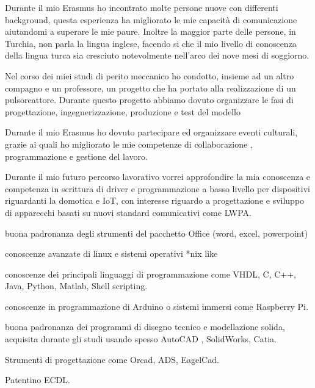 \documentclass[italian,a4paper]{europasscv}
\begin{document}
\begin{europasscv}
	 {
		\begin{ecvitemize}
			\item Durante il mio Erasmus ho incontrato molte persone nuove con
				differenti background, questa esperienza ha migliorato le mie
				capacità di comunicazione aiutandomi a superare le mie paure.
				Inoltre la maggior parte delle persone, in Turchia, non parla la
				lingua inglese, facendo si che il mio livello di conoscenza della
				lingua turca sia cresciuto notevolmente nell'arco dei nove mesi
				di soggiorno.
		\end{ecvitemize}
	}

	 {
	\begin{ecvitemize}
		\item Nel corso dei miei studi di perito meccanico ho condotto, insieme
			ad un altro compagno e un professore, un progetto che ha portato alla
			realizzazione di un pulsoreattore. Durante questo progetto abbiamo
			dovuto organizzare le fasi di progettazione, ingegnerizzazione,
			produzione e test del modello
		\item Durante il mio Erasmus ho dovuto partecipare ed organizzare eventi
			culturali, grazie ai quali ho migliorato le mie competenze di
			collaborazione , programmazione e gestione del lavoro.
	\end{ecvitemize}
	}

	 {
	\begin{ecvitemize}
		\item Durante il mio futuro percorso lavorativo vorrei approfondire la mia
			conoscenza e competenza in scrittura di driver e programmazione a basso
			livello per dispositivi riguardanti la domotica e IoT, con interesse
			riguardo a progettazione e sviluppo di apparecchi basati su nuovi standard
			comunicativi come LWPA.
	\end{ecvitemize}
	}

	 {
		\begin{ecvitemize}
			\item buona padronanza degli strumenti del pacchetto Office (word, excel,
				powerpoint)
			\item conoscenze avanzate di linux e sistemi operativi *nix like
			\item conoscenze dei principali linguaggi di programmazione come VHDL, C,
				C++, Java, Python, Matlab, Shell scripting.
			\item conoscenze in programmazione di Arduino o sistemi immersi come
				Raspberry Pi.
			\item buona padronanza dei programmi di disegno tecnico e
				modellazione solida, acquisita durante gli studi usando
				spesso AutoCAD , SolidWorks, Catia.
			\item Strumenti di progettazione come Orcad, ADS, EagelCad.
			\item Patentino ECDL.
		\end{ecvitemize}
	}


\end{europasscv}
\end{document}
